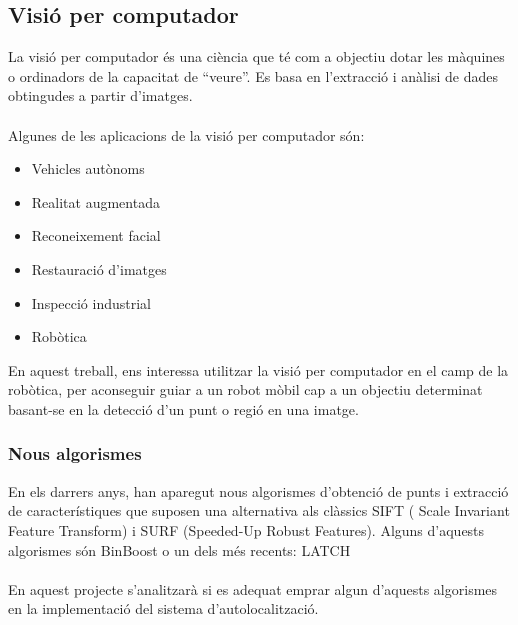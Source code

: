 	\subsection{Visió per computador}
		La visió per computador\cite{Szeliski} és una ciència que té com a objectiu dotar les màquines o ordinadors de la capacitat de ``veure''.
		Es basa en l'extracció i anàlisi de dades obtingudes a partir d'imatges.\\\\
		Algunes de les aplicacions de la visió per computador són:\\
		\begin{itemize}
			\item Vehicles autònoms
			\item Realitat augmentada
			\item Reconeixement facial
			\item Restauració d'imatges
			\item Inspecció industrial 
			\item Robòtica\\
		\end{itemize}
		En aquest treball, ens interessa utilitzar la visió per computador en el camp de la robòtica, per aconseguir guiar a un robot mòbil cap a un objectiu
		determinat basant-se en la detecció d'un punt o regió en una imatge.
		\subsubsection{Nous algorismes}
			En els darrers anys, han aparegut nous algorismes d'obtenció de punts i extracció de característiques que suposen una alternativa als clàssics SIFT\cite{SIFT}
			( Scale Invariant Feature Transform) i SURF\cite{SURF} (Speeded-Up Robust Features). Alguns d'aquests algorismes són BinBoost\cite{Trzcinski13a} o un dels més recents:
			LATCH\cite{LeviHassner2016LATCH}\\\\
			En aquest projecte s'analitzarà si es adequat emprar algun d'aquests algorismes en la implementació del sistema d'autolocalització. 
\newpage
